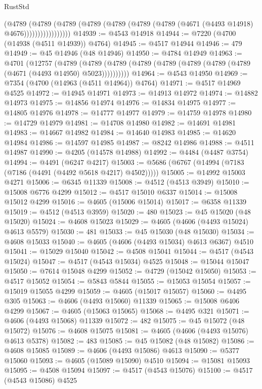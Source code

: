 \begin{lexlean}{RustStd}
\begin{coremodule}
                      (@4789
                        (@4789
                          (@4789
                            (@4789 (@4789 (@4789 (@4789 (@4671 (@4493 @14918) @4676)))))))))))))))))
@14939 := @4543 @14918
@14944 := @7220 (@4700 (@14938 (@4511 @14939)) @4764)
@14945 := @4517 @14944
@14946 := 479
@14949 := @45 @14946 (@48 @14946)
@14950 := @4784 @14949
@14963 := @4701
    (@12757
      (@4789 (@4789 (@4789 (@4789 (@4789 (@4789 (@4789 (@4789 (@4671 (@4493 @14950) @5023))))))))))
@14964 := @4543 @14950
@14969 := @7354 (@4700 (@14963 (@4511 @14964)) @4764)
@14971 := @4517 @14969 @4525
@14972 := @14945 @14971
@14973 := @14913 @14972
@14974 := @14882 @14973
@14975 := @14856 @14974
@14976 := @14834 @14975
@14977 := @14805 @14976
@14978 := @14777 @14977
@14979 := @14759 @14978
@14980 := @14729 @14979
@14981 := @14708 @14980
@14982 := @14691 @14981
@14983 := @14667 @14982
@14984 := @14640 @14983
@14985 := @14620 @14984
@14986 := @14597 @14985
@14987 := @8242 @14986
@14988 := @4511 @14987
@14990 := @4205 (@14578 @14988)
@14992 := @4484 (@4487 @3754)
@14994 := @4491 (@6247 @4217)
@15003 := @5686 (@6767 (@14994 (@7183 (@7186 (@4491 (@4492 @5618 @4217) @4502)))))
@15005 := @14992 @15003 @4271
@15006 := @6345 @11339
@15008 := @4512 (@4513 @3949)
@15010 := @15008 @6776 @4299
@15012 := @4517 @15010 @6337
@15014 := @15008 @15012 @4299
@15016 := @4605 (@15006 @15014)
@15017 := @6358 @11339
@15019 := @4512 (@4513 @3959)
@15020 := 480
@15023 := @45 @15020 (@48 @15020)
@15024 := @4608 @15023
@15029 := @4605 (@4606 (@4493 @15024) @4613 @5579)
@15030 := 481
@15033 := @45 @15030 (@48 @15030)
@15034 := @4608 @15033
@15040 := @4605 (@4606 (@4493 @15034) @4613 @6367) @4510
@15041 := @15029 @15040
@15042 := @4508 @15041
@15044 := @4517 (@4543 @15024)
@15047 := @4517 (@4543 @15034) @4525
@15048 := @15044 @15047
@15050 := @7614 @15048 @4299
@15052 := @4729 (@15042 @15050)
@15053 := @4517 @15052
@15054 := @5843 @5844
@15055 := @15053 @15054
@15057 := @15019 @15055 @4299
@15059 := @4605 (@15017 @15057)
@15060 := @4495 @305
@15063 := @4606 (@4493 @15060) @11339
@15065 := @15008 @6406 @4299
@15067 := @4605 (@15063 @15065)
@15068 := @4495 @321
@15071 := @4606 (@4493 @15068) @11339
@15072 := 482
@15075 := @45 @15072 (@48 @15072)
@15076 := @4608 @15075
@15081 := @4605 (@4606 (@4493 @15076) @4613 @5378)
@15082 := 483
@15085 := @45 @15082 (@48 @15082)
@15086 := @4608 @15085
@15089 := @4606 (@4493 @15086) @4613
@15090 := @5377 @15060
@15093 := @4605 (@15089 @15090) @4510
@15094 := @15081 @15093
@15095 := @4508 @15094
@15097 := @4517 (@4543 @15076)
@15100 := @4517 (@4543 @15086) @4525

\end{coremodule}
\end{lexlean}
